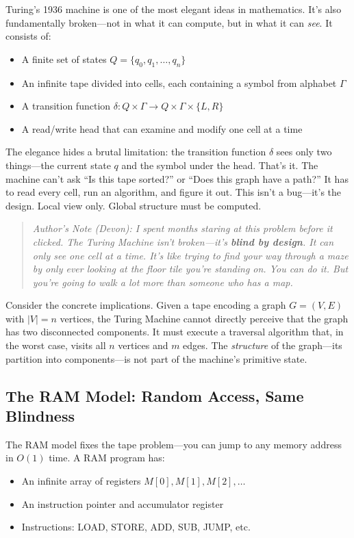 Turing's 1936 machine \cite{turing1936computable} is one of the most elegant ideas in mathematics. It's also fundamentally broken---not in what it can compute, but in what it can \emph{see}. It consists of:
\begin{itemize}
    \item A finite set of states $Q = \{q_0, q_1, \ldots, q_n\}$
    \item An infinite tape divided into cells, each containing a symbol from alphabet $\Gamma$
    \item A transition function $\delta: Q \times \Gamma \to Q \times \Gamma \times \{L, R\}$
    \item A read/write head that can examine and modify one cell at a time
\end{itemize}

The elegance hides a brutal limitation: the transition function $\delta$ sees only two things---the current state $q$ and the symbol under the head. That's it. The machine can't ask ``Is this tape sorted?'' or ``Does this graph have a path?'' It has to read every cell, run an algorithm, and figure it out. This isn't a bug---it's the design. Local view only. Global structure must be computed.

\begin{quote}
\textit{Author's Note (Devon): I spent months staring at this problem before it clicked. The Turing Machine isn't broken---it's \textbf{blind by design}. It can only see one cell at a time. It's like trying to find your way through a maze by only ever looking at the floor tile you're standing on. You \textit{can} do it. But you're going to walk a lot more than someone who has a map.}
\end{quote}

Consider the concrete implications. Given a tape encoding a graph $G = (V, E)$ with $|V| = n$ vertices, the Turing Machine cannot directly perceive that the graph has two disconnected components. It must execute a traversal algorithm that, in the worst case, visits all $n$ vertices and $m$ edges. The \textit{structure} of the graph---its partition into components---is not part of the machine's primitive state.

\subsection{The RAM Model: Random Access, Same Blindness}

The RAM model fixes the tape problem---you can jump to any memory address in $O(1)$ time. A RAM program has:
\begin{itemize}
    \item An infinite array of registers $M[0], M[1], M[2], \ldots$
    \item An instruction pointer and accumulator register
    \item Instructions: LOAD, STORE, ADD, SUB, JUMP, etc.
\end{itemize}

